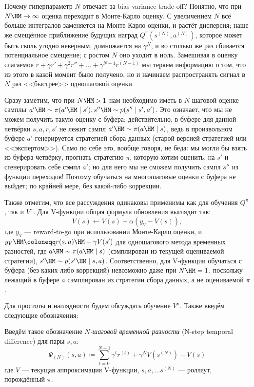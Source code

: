 Почему гиперпараметр $N$ отвечает за bias-variance trade-off? Понятно, что при $N \HM\to \infty$ оценка переходит в Монте-Карло оценку. С увеличением $N$ всё больше интегралов заменяется на Монте-Карло оценки, и растёт дисперсия; наше же смещённое приближение будущих наград $Q^{\pi}(s^{(N)}, a^{(N)})$, которое может быть сколь угодно неверным, домножается на $\gamma^N$, и во столько же раз сбивается потенциальное смещение; с ростом $N$ оно уходит в ноль. Замешивая в оценку слагаемое $r + \gamma r' + \gamma^2 r'' + \dots + \gamma^{N-1} r^{(N-1)}$ мы теряем информацию о том, что из этого в какой момент было получено, но и начинаем распространять сигнал в $N$ раз <<быстрее>> одношаговой оценки.

Сразу заметим, что при $N \HM> 1$ нам необходимо иметь в $N$-шаговой оценке сэмплы $a' \HM\sim \pi(a' \HM\mid s'), s'' \HM\sim p(s'' \mid s', a')$. Это означает, что мы не можем получить такую оценку с буфера: действительно, в буфере для данной четвёрки $s, a, r, s'$ не лежит сэмпл $a' \HM\sim \pi(a \HM\mid s)$, ведь в произвольном буфере $a'$ генерируется стратегией сбора данных (старой версией стратегией или <<экспертом>>). Само по себе это, вообще говоря, не беда: мы могли бы взять из буфера четвёрку, прогнать стратегию $\pi$, которую хотим оценить, на $s'$ и сгенерировать себе сэмпл $a'$; но для него мы не сможем получить сэмпл $s''$ из функции переходов! Поэтому обучаться на многошаговые оценки с буфера не выйдет; по крайней мере, без какой-либо коррекции.

Также отметим, что все рассуждения одинаковы применимы как для обучения $Q^\pi$, так и $V^\pi$. Для V-функции общая формула обновления выглядит так:
\begin{equation}\label{generalTD}
V(s) \leftarrow V(s) + \alpha \left( y_V - V(s) \right),
\end{equation}
где $y_V$ --- reward-to-go при использовании Монте-Карло оценки, и $y_V \HM \coloneqq r(s, a) \HM+ \gamma V(s')$ для одношагового метода временных разностей, где $a \HM \sim \pi(a \HM \mid s)$ (сэмплирован из текущей оцениваемой стратегии), $s' \HM \sim p(s' \HM\mid s, a)$. Соответственно, для V-функции обучаться с буфера (без каких-либо коррекций) невозможно даже при $N \HM= 1$, поскольку лежащий в буфере $a$ сэмплирован из стратегии сбора данных, а не оцениваемой $\pi$.

Для простоты и наглядности будем обсуждать обучение $V^\pi$. Также введём следующие обозначения:

\begin{definition}
Введём такое обозначение \emph{$N$-шаговой временной разности} (N-step temporal difference) для пары $s, a$:
\begin{equation}\label{Nstepadvantage}
\Psi_{(N)} (s, a) \coloneqq \sum_{t=0}^{N-1} \gamma^{t} r^{(t)} + \gamma^N V(s^{(N)}) - V(s)
\end{equation}
где $V$ --- текущая аппроксимация V-функции, $s, a, \dots s^{(N)}$ --- роллаут, порождённый $\pi$.
\end{definition}

